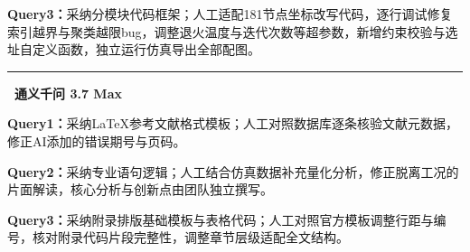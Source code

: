 \documentclass[12pt,a4paper]{ctexart}
\begin{document}
\textbf{Query3：}采纳分模块代码框架；人工适配181节点坐标改写代码，逐行调试修复索引越界与聚类越限bug，调整退火温度与迭代次数等超参数，新增约束校验与选址自定义函数，独立运行仿真导出全部配图。

\noindent\rule{\linewidth}{0.4pt}

\noindent\textbf{\textbullet~通义千问 3.7 Max}

\textbf{Query1：}采纳LaTeX参考文献格式模板；人工对照数据库逐条核验文献元数据，修正AI添加的错误期号与页码。

\textbf{Query2：}采纳专业语句逻辑；人工结合仿真数据补充量化分析，修正脱离工况的片面解读，核心分析与创新点由团队独立撰写。

\textbf{Query3：}采纳附录排版基础模板与表格代码；人工对照官方模板调整行距与编号，核对附录代码片段完整性，调整章节层级适配全文结构。
\end{document}
